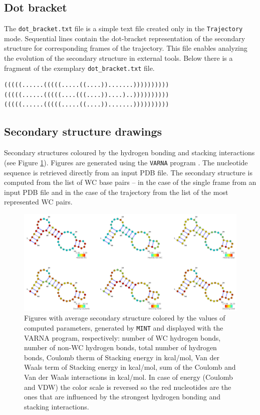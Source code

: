 \documentclass[12pt]{article}
\begin{document}
\subsection{Dot bracket}
The {\tt dot\_bracket.txt} file is a simple text file created only in the {\tt Trajectory} mode. Sequential lines contain the dot-bracket representation of the secondary structure for corresponding frames of the trajectory. This file enables analyzing the evolution of the secondary structure in external tools. Below there is a fragment of the exemplary {\tt dot\_bracket.txt} file. 
\begin{verbatim}
(((((......(((((.....((....)).......))))))))))
(((((......(((((....(((....))....)..))))))))))
(((((......(((((.....((....)).......))))))))))
\end{verbatim}


\subsection{Secondary structure drawings}
Secondary structures coloured by the hydrogen bonding and stacking interactions (see Figure \ref{varna}). Figures are generated using the  {\tt VARNA} program \cite{Blin2009}. The nucleotide sequence is retrieved directly from an input PDB file. The secondary structure is computed from the list of WC base pairs -- in the case of the single frame from an input PDB file and in the case of the trajectory from the list of the most represented WC pairs. 

\begin{figure}[h!]
\centering
\includegraphics[scale=0.5]{./pictures/varna6.png}
\caption{Figures with average secondary structure colored by the values of computed parameters, generated by {\tt MINT} and displayed with the VARNA \cite{Blin2009} program, respectively: number of WC hydrogen bonds, number of non-WC hydrogen bonds, total number of hydrogen bonds, Coulomb therm of Stacking energy in kcal/mol, Van der Waals term of Stacking energy in kcal/mol, sum of the Coulomb and Van der Waals interactions in kcal/mol. In case of energy (Coulomb and VDW) the color scale is reversed so the red nucleotides are the ones that are influenced by the strongest hydrogen bonding and stacking interactions. }
\label{varna}
\end{figure}
\end{document}
